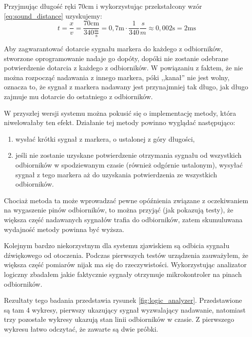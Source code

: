 Przyjmując długość ręki 70cm i wykorzystując przekstałcony wzór \ref{eq:sound_distance} uzyskujemy:
\begin{equation}
 t = \frac{x}{v} = \frac{70\textrm{cm}}{340\frac{\textrm{m}}{\textrm{s}}} = 0,7\textrm{m} \cdot \frac{1}{340}\frac{s}{m} \approx 0,002\textrm{s} = 2\textrm{ms}
 \label{eq:reporting_speed}
\end{equation}

Aby zagwarantować dotarcie sygnału markera do każdego z odbiorników, stworzone oprogramowanie nadaje go dopóty, dopóki nie zostanie odebrane potwierdzenie dotarcia z każdego z odbiorników. W powiązaniu z faktem, że nie można rozpocząć nadawania z innego markera, póki ,,kanał'' nie jest wolny, oznacza to, że sygnał z markera nadawany jest przynajmniej tak długo, jak długo zajmuje mu dotarcie do ostatniego z odbiorników.

W przyszłej wersji systemu można pokusić się o implementację metody, która niwelowałaby ten efekt. Działanie tej metody powinno wyglądać następująco:
\begin{enumerate}
 \item wysłać krótki sygnał z markera, o ustalonej z góry długości,
 \item jeśli nie zostanie uzyskane potwierdzenie otrzymania sygnału od wszystkich odbiorników w spodziewanym czasie (również odgórnie ustalonym), wysyłać sygnał z tego markera aż do uzyskania potwierdzenia ze wszystkich odbiorników.
\end{enumerate}
Chociaż metoda ta może wprowadzać pewne opóźnienia związane z oczekiwaniem na wygaszenie pinów odbiorników, to można przyjąć (jak pokazują testy), że większa część nadawanych sygnałów trafia do odbiorników, zatem skumuluwana wydajność metody powinna być wyższa.

Kolejnym bardzo niekorzystnym dla systemu zjawiskiem są odbicia sygnału dźwiękowego od otoczenia. Podczas pierwszych testów urządzenia zauważyłem, że większa część pomiarów nijak ma się do rzeczywistości. Wykorzystując analizator logiczny zbadałem jakie faktycznie sygnały otrzymuje mikrokontroler na pinach odbiorników.

Rezultaty tego badania przedstawia rysunek \ref{fig:logic_analyzer}. Przedstawione są tam 4 wykresy, pierwszy ukazujący sygnał wyzwalający nadawanie, natomiast trzy pozostałe wykresy ukazują stan linii odbiorników w czasie. Z pierwszego wykresu łatwo odczytać, że zawarte są dwie próbki.

